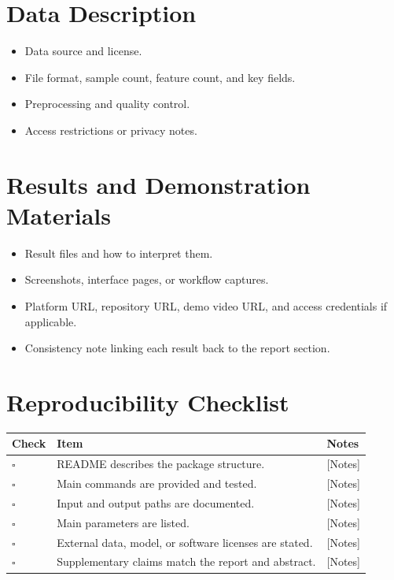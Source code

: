 \documentclass[11pt,a4paper]{article}
\newcommand{\placeholder}[1]{[#1]}
\begin{document}
\section{Data Description}
\begin{itemize}
  \item Data source and license.
  \item File format, sample count, feature count, and key fields.
  \item Preprocessing and quality control.
  \item Access restrictions or privacy notes.
\end{itemize}

\section{Results and Demonstration Materials}
\begin{itemize}
  \item Result files and how to interpret them.
  \item Screenshots, interface pages, or workflow captures.
  \item Platform URL, repository URL, demo video URL, and access credentials if applicable.
  \item Consistency note linking each result back to the report section.
\end{itemize}

\section{Reproducibility Checklist}
\begin{tabularx}{\textwidth}{p{}X X}
\toprule
\textbf{Check} & \textbf{Item} & \textbf{Notes}\\
\midrule
$\square$ & README describes the package structure. & \placeholder{Notes}\\
$\square$ & Main commands are provided and tested. & \placeholder{Notes}\\
$\square$ & Input and output paths are documented. & \placeholder{Notes}\\
$\square$ & Main parameters are listed. & \placeholder{Notes}\\
$\square$ & External data, model, or software licenses are stated. & \placeholder{Notes}\\
$\square$ & Supplementary claims match the report and abstract. & \placeholder{Notes}\\
\bottomrule
\end{tabularx}
\end{document}
